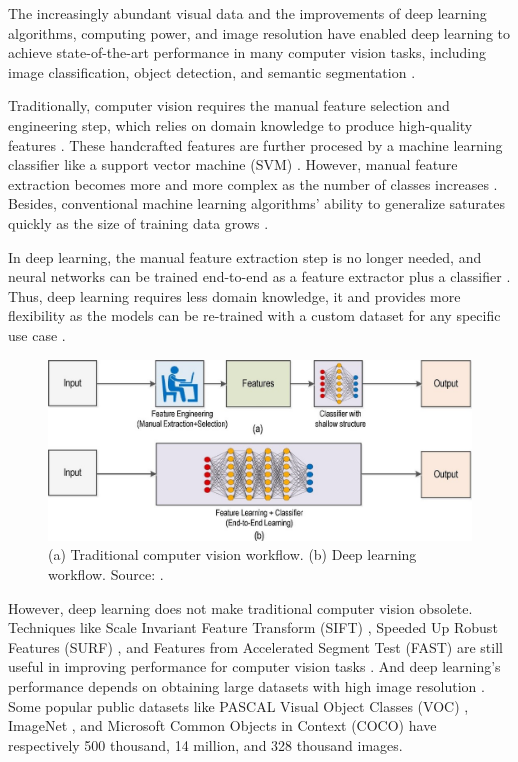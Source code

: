 \documentclass[a4paper, 11pt, oneside]{article}
\begin{document}
  The increasingly abundant visual data and the improvements of deep learning algorithms, computing power, and image
  resolution have enabled deep learning to achieve state-of-the-art performance in many computer vision tasks, including
  image classification, object detection, and semantic segmentation \cite{qin2015underwater, voulodimos2018deep, o2019deep}.

  Traditionally, computer vision requires the manual feature selection and engineering step, which relies on domain knowledge
  to produce high-quality features \cite{elgendy2020deep, zhao2019object, o2019deep}. These handcrafted features are further
  procesed by a machine learning classifier like a support vector machine (SVM)
  \cite{elgendy2020deep, zhao2019object, o2019deep}. However, manual feature extraction becomes more and more complex as
  the number of classes increases \cite{o2019deep}. Besides, conventional machine learning algorithms' ability to
  generalize saturates quickly as the size of training data grows \cite{qin2015underwater}.

  In deep learning, the manual feature extraction step is no longer needed, and neural networks can be trained end-to-end
  as a feature extractor plus a classifier \cite{elgendy2020deep, o2019deep}. Thus, deep learning requires less domain
  knowledge, it and provides more flexibility as the models can be re-trained with a custom dataset for any specific use
  case \cite{o2019deep}.

  \begin{figure}[ht]
    \begin{center}
      \includegraphics[width=.8\textwidth]{deep_learning_vs_traditional_computer_vision.png}
    \end{center}
    \caption{(a) Traditional computer vision workflow. (b) Deep learning workflow. Source: \cite{o2019deep}.}
  \end{figure}

  However, deep learning does not make traditional computer vision obsolete. Techniques like Scale Invariant Feature Transform
  (SIFT) \cite{karami2017image}, Speeded Up Robust Features (SURF) \cite{bay2006surf}, and Features from Accelerated
  Segment Test (FAST) \cite{rosten2006machine} are still useful in improving performance for computer vision tasks
  \cite{o2019deep}. And deep learning's performance depends on obtaining large datasets with high image resolution \cite{o2019deep}.
  Some popular public datasets like PASCAL Visual Object Classes (VOC) \cite{everingham2010pascal}, ImageNet
  \cite{russakovsky2015imagenet}, and Microsoft Common Objects in Context (COCO) \cite{lin2014microsoft}
  have respectively 500 thousand, 14 million, and 328 thousand images.
\end{document}

